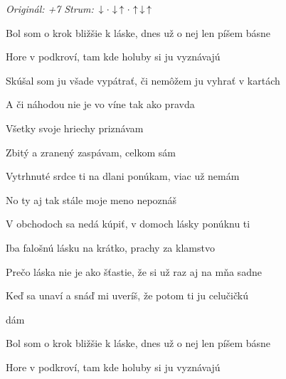 \begin{song}


\begin{headerbox}
 \quad
\textit{Originál: +7} \quad
\textit{Strum:} $\Down\Miss\Down\Up\Miss\Up\Down\Up$ 
\end{headerbox}

\begin{hchordbox}
\end{hchordbox}

\Large

\bigskip

Bol som o krok bližšie k láske, dnes už o nej len píšem básne \par
Hore v podkroví, tam kde holuby si ju vyznávajú \par
{}Skúšal som ju všade vypátrať, či nemôžem ju vyhrať v kartách \par
A či náhodou nie je vo víne tak ako pravda \par
{} 

\bigskip

\begin{chorusbox}{\Refren}
Všetky svoje hriechy priznávam \par
{}Zbitý a zranený zaspávam, celkom sám \par
Vytrhnuté srdce ti na dlani ponúkam, viac už nemám \par
No ty aj tak stále moje meno nepoznáš \par
\end{chorusbox}

\bigskip

V obchodoch sa nedá kúpiť, v domoch lásky ponúknu ti \par
Iba falošnú lásku na krátko, prachy za klamstvo \par
Prečo láska nie je ako šťastie, že si už raz aj na mňa sadne \par
Keď sa unaví a snáď mi uveríš, že potom ti ju celučičkú \par
{}dám  \par

\bigskip

\Refren

\bigskip

Bol som o krok bližšie k láske, dnes už o nej len píšem básne \par
Hore v podkroví, tam kde holuby si ju vyznávajú \par

\bigskip

\Refren

\end{song}
